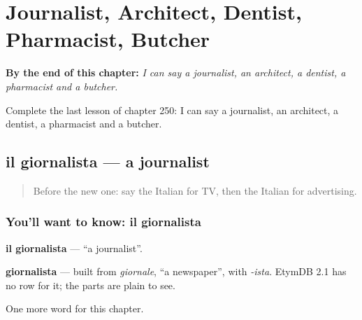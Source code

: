 
\chapter{Journalist, Architect, Dentist, Pharmacist, Butcher}
\label{ch:it-journalist-architect-dentist-pharmacist-butcher}

\begin{chapteropening}
\textbf{By the end of this chapter:} \emph{I can say a journalist, an architect, a dentist, a pharmacist and a butcher.}

Complete the last lesson of chapter 250: I can say a journalist, an architect, a dentist, a pharmacist and a butcher.
\end{chapteropening}

\section[il giornalista]{il giornalista — a journalist}

\label{lesson:IT-C250-giornalista}



\begin{quote}
Before the new one: say the Italian for TV, then the Italian for advertising.
\end{quote}

\subsection*{You'll want to know: il giornalista}
\textbf{il giornalista} — \textquotedblleft{}a journalist\textquotedblright{}.

\begin{cousinweb}
\textbf{giornalista} — built from \emph{giornale}, \textquotedblleft{}a newspaper\textquotedblright{}, with \emph{-ista}. EtymDB 2.1 has no row for it; the parts are plain to see.
\end{cousinweb}

\begin{grammarlens}[title={What you've built}]
One more word for this chapter.
\end{grammarlens}

